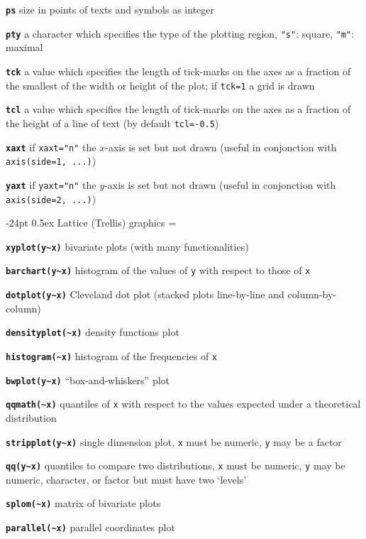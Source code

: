 \documentclass[10pt,landscape]{article}
\makeatletter
\renewcommand\section{\@startsection{section}{1}{0mm}%
                                     {-24pt}%
                                     {0.5ex}%
                                {\color{blue}\normalfont\large\bfseries}}
\newcommand{\code}{\texttt}
\newcommand{\bcode}[1]{\texttt{\textbf{#1}}}
\makeatother
\begin{document}
\begin{multicols*}{3}
\bcode{ps}   size in points of texts and symbols as integer

\bcode{pty}  a character which specifies the type of the plotting region, \code{"s"}: square, \code{"m"}: maximal

\bcode{tck}  a value which specifies the length of tick-marks on the axes as a fraction of the smallest of the width or height of the plot; if \code{tck=1} a grid is drawn

\bcode{tcl}  a value which specifies the length of tick-marks on the axes as a fraction of the height of a line of text (by default \code{tcl=-0.5})

\bcode{xaxt}  if \code{xaxt="n"} the $x$-axis is set but not drawn (useful in conjonction with \code{axis(side=1, ...)})

\bcode{yaxt}  if \code{yaxt="n"} the $y$-axis is set but not drawn (useful in conjonction with \code{axis(side=2, ...)})





\section{Lattice (Trellis) graphics}
\everypar={\hangindent=9mm}

\bcode{xyplot(y\~{}x)}  bivariate plots (with many functionalities)

\bcode{barchart(y\~{}x)}  histogram of the values of \code{y} with
respect to those of \code{x}

\bcode{dotplot(y\~{}x)}  Cleveland dot plot (stacked plots line-by-line
and column-by-column)

\bcode{densityplot(\~{}x)}  density functions plot

\bcode{histogram(\~{}x)}  histogram of the frequencies of \code{x}

\bcode{bwplot(y\~{}x)}  ``box-and-whiskers'' plot

\bcode{qqmath(\~{}x)}  quantiles of \code{x} with respect to the values expected under a theoretical distribution

\bcode{stripplot(y\~{}x)}  single dimension plot, \code{x} must be numeric, \code{y} may be a factor

\bcode{qq(y\~{}x)}  quantiles to compare two distributions, \code{x} must be numeric, \code{y} may be numeric, character, or factor but must have two `levels'

\bcode{splom(\~{}x)}  matrix of bivariate plots

\bcode{parallel(\~{}x)}  parallel coordinates plot


\end{multicols*}
\end{document}
